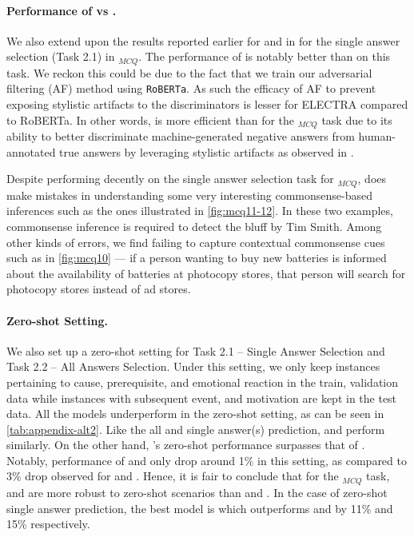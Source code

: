 \paragraph{Performance of  vs .}
We also extend upon the results reported earlier for  and  in  for the single answer selection (Task 2.1) in \dataset{}$_{MCQ}$. The performance of  is notably better than  on this task. We reckon this could be due to the fact that we train our adversarial filtering (AF) method using \texttt{RoBERTa}. As such the efficacy of AF to prevent exposing stylistic artifacts to the discriminators is lesser for ELECTRA compared to RoBERTa. In other words,  is more efficient than  for the \dataset{}$_{MCQ}$ task due to its ability to better discriminate machine-generated negative answers from human-annotated true answers by leveraging stylistic artifacts as observed in \citet{zellers2018swag}.

Despite performing decently on the single answer selection task for \dataset{}$_{MCQ}$,  does make mistakes in understanding some very interesting commonsense-based inferences such as the ones illustrated in \cref{fig:mcq11-12}. In these two examples, commonsense inference is required to detect the bluff by Tim Smith. Among other kinds of errors, we find  failing to capture contextual commonsense cues such as in \cref{fig:mcq10} --- if a person wanting to buy new batteries is informed about the availability of batteries at photocopy stores, that person will search for photocopy stores instead of ad stores. 

\paragraph{Zero-shot Setting.} We also set up a zero-shot setting for Task 2.1 -- Single Answer Selection and Task 2.2 -- All Answers Selection. Under this setting, we only keep instances pertaining to cause, prerequisite, and emotional reaction in the train, validation data while instances with subsequent event, and motivation are kept in the test data. All the models underperform in the zero-shot setting, as can be seen in \cref{tab:appendix-alt2}. Like the all and single answer(s) prediction,  and  perform similarly. On the other hand, 's zero-shot performance surpasses that of . Notably, performance of  and  only drop around 1\% in this setting, as compared to 3\% drop observed for  and . Hence, it is fair to conclude that for the \dataset{}$_{MCQ}$ task,  and  are more robust to zero-shot scenarios than  and . In the case of zero-shot single answer prediction, the best model is  which outperforms  and  by 11\% and 15\% respectively. 

